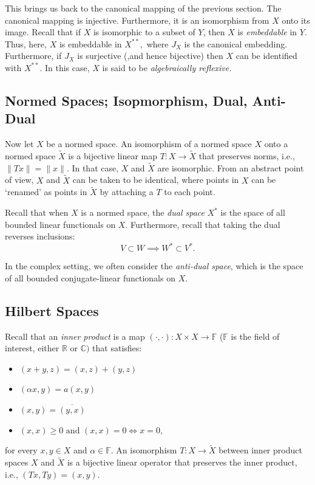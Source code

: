 \documentclass[12pt,a4paper]{article}
\theoremstyle{boldthm}
\theoremstyle{bolddefn}
\begin{document}
This brings us back to the canonical mapping of the previous section. The canonical mapping is injective. Furthermore, it is an isomorphism from $X$ onto its image. Recall that if $X$ is isomorphic to a subset of $Y$, then $X$ is \textit{embeddable} in $Y.$ Thus, here, $X$ is embeddable in $X^{**},$ where $J_X$ is the canonical embedding. Furthermore, if $J_X$ is surjective (,and hence bijective) then $X$ can be identified with $X^{**}.$ In this case, $X$ is said to be \textit{algebraically reflexive.}

\subsection{Normed Spaces; Isopmorphism, Dual, Anti-Dual \cite[Section 2.10]{krey}}

Now let $X$ be a normed space. An isomorphism of a normed space $X$ onto a normed space $\tilde X$ is a bijective linear map $T : X \rightarrow \tilde X$ that preserves norms, i.e., $\| Tx \| = \|x\|$. In that case, $X$ and $\tilde X$ are isomorphic. From an abstract point of view, $X$ and $\tilde X$ can be taken to be identical, where points in $X$ can be `renamed' as points in $\tilde X$ by attaching a $T$ to each point. 


Recall that when $X$ is a normed space, the \textit{dual space} $X^*$ is the space of all bounded linear functionals on $X.$ Furthermore, recall that taking the dual reverses inclusions:
\begin{equation}
    V \subset W \implies W^* \subset V^*.
\end{equation}

In the complex setting, we often consider the \textit{anti-dual space}, which is the space of all bounded conjugate-linear functionals on $X.$ 

\subsection{Hilbert Spaces \cite[Section 3.1]{krey}}

 Recall that an \textit{inner product} is a map $(\cdot, \cdot) : X \times X \rightarrow \mathbb{F}$ ($\mathbb{F}$ is the field of interest, either $\mathbb{R}$ or $\mathbb{C})$ that satisfies:
\begin{itemize}
    \item $(x+y, z) = (x, z) + (y, z)$
    \item $(\alpha x, y ) = a (x, y)$
    \item $(x, y) = \overline{(y, x)}$
    \item $(x, x) \ge 0  \text{ and } (x, x) = 0 \iff x = 0,$ 
\end{itemize}
for every $x, y \in X$ and $\alpha \in \mathbb{F}.$ An isomorphism $T: X \rightarrow \tilde X$ between inner product spaces $X$ and $\tilde X$ is a bijective linear operator that preserves the inner product, i.e., $(Tx, Ty) = (x, y).$
\end{document}
